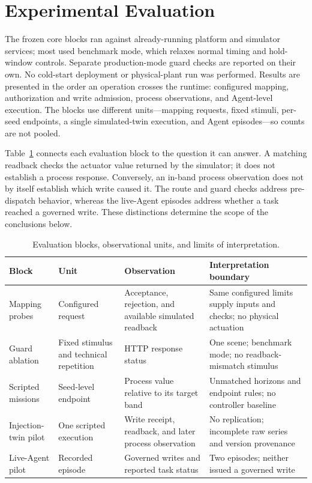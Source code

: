 \section{Experimental Evaluation}
\label{sec:eval}
The frozen core blocks ran against already-running platform and simulator services; most used benchmark mode, which relaxes normal timing and hold-window controls. Separate production-mode guard checks are reported on their own. No cold-start deployment or physical-plant run was performed. Results are presented in the order an operation crosses the runtime: configured mapping, authorization and write admission, process observations, and Agent-level execution. The blocks use different units—mapping requests, fixed stimuli, per-seed endpoints, a single simulated-twin execution, and Agent episodes—so counts are not pooled.

Table~\ref{tab:evidence-scope} connects each evaluation block to the question it can answer. A matching readback checks the actuator value returned by the simulator; it does not establish a process response. Conversely, an in-band process observation does not by itself establish which write caused it. The route and guard checks address pre-dispatch behavior, whereas the live-Agent episodes address whether a task reached a governed write. These distinctions determine the scope of the conclusions below.

\begin{table}[!t]
\centering
\caption{Evaluation blocks, observational units, and limits of interpretation.}
\label{tab:evidence-scope}
\footnotesize
\setlength{\tabcolsep}{5pt}
\begin{tabularx}{\textwidth}{@{}>{\raggedright\arraybackslash}p{}>{\raggedright\arraybackslash}p{}>{\raggedright\arraybackslash}p{}X@{}}
\toprule
Block & Unit & Observation & Interpretation boundary \\
\midrule
Mapping probes & Configured request & Acceptance, rejection, and available simulated readback & Same configured limits supply inputs and checks; no physical actuation \\
Guard ablation & Fixed stimulus and technical repetition & HTTP response status & One scene; benchmark mode; no readback-mismatch stimulus \\
Scripted missions & Seed-level endpoint & Process value relative to its target band & Unmatched horizons and endpoint rules; no controller baseline \\
Injection-twin pilot & One scripted execution & Write receipt, readback, and later process observation & No replication; incomplete raw series and version provenance \\
Live-Agent pilot & Recorded episode & Governed writes and reported task status & Two episodes; neither issued a governed write \\
\bottomrule
\end{tabularx}
\end{table}

